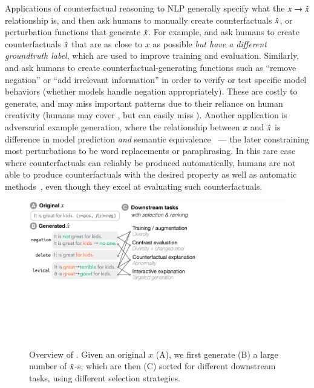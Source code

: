 Applications of counterfactual reasoning to NLP generally specify what the $x \rightarrow \hat{x}$ relationship is, and then ask humans to manually create counterfactuals $\hat{x}$, or perturbation functions that generate $\hat{x}$.
For example, \citet{gardner2020contrast} and \citet{kaushik2019learning} ask humans to create counterfactuals $\hat{x}$ that are as close to $x$ as possible \emph{but have a different groundtruth label}, which are used to improve training and evaluation. 
Similarly, \citet{wu2019errudite} and \citet{checklist:acl20} ask humans to create counterfactual-generating functions such as ``remove negation'' or ``add irrelevant information'' in order to verify or test specific model behaviors (\eg whether models handle negation appropriately).
These are costly to generate, and may miss important patterns due to their reliance on human creativity (\eg humans may cover , but can easily miss ).
Another application is adversarial example generation, where the relationship between $x$ and $\hat{x}$ is difference in model prediction \emph{and} semantic equivalence~\cite{iyyer2018adversarial, ribeiro2018semantically} --- the later constraining most perturbations to be word replacements or paraphrasing.
In this rare case where counterfactuals can reliably be produced automatically, humans are not able to produce counterfactuals with the desired property as well as automatic methods~\cite{ribeiro2018semantically}, even though they excel at evaluating such counterfactuals.

\begin{figure}[t]
\centering
\includegraphics[trim={0 17cm 23cm 0cm},clip, width=1\columnwidth]{figures/teaser}
\vspace{-15pt}
\caption{
Overview of \sysname. 
Given an original $x$ (A), we first generate (B) a large number of $\hat{x}$-s, which are then (C) sorted for different downstream tasks, using different selection strategies.}
\vspace{-15pt}
\label{fig:teaser}
\end{figure} 
 

